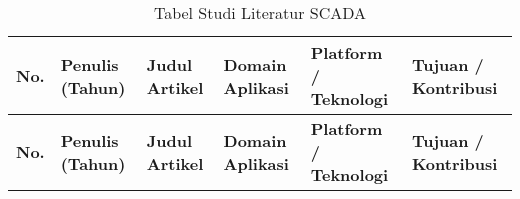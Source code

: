 
\begin{landscape}
    \begin{longtable}{>{\raggedright\arraybackslash}p{0.5cm}
        >{\raggedright\arraybackslash}p{2.5cm}
        >{\raggedright\arraybackslash}p{3cm}
        >{\raggedright\arraybackslash}p{2.8cm}
        >{\raggedright\arraybackslash}p{3.5cm}
        >{\raggedright\arraybackslash}p{6.5cm}}

        \caption{Tabel Studi Literatur SCADA}                                                                                                                                                                                                                                                                                                                                                                                                                                                                      \\
        \hline
        \textbf{No.} & \textbf{Penulis (Tahun)} & \textbf{Judul Artikel}                                                                                        & \textbf{Domain Aplikasi}                     & \textbf{Platform / Teknologi}                                                                                & \textbf{Tujuan / Kontribusi}                                                                                                                                                       \\
        \hline
        \endfirsthead

        \hline
        \textbf{No.} & \textbf{Penulis (Tahun)} & \textbf{Judul Artikel}                                                                                        & \textbf{Domain Aplikasi}                     & \textbf{Platform / Teknologi}                                                                                & \textbf{Tujuan / Kontribusi}                                                                                                                                                       \\
        \hline
        \endhead


\end{longtable}
\end{landscape}
